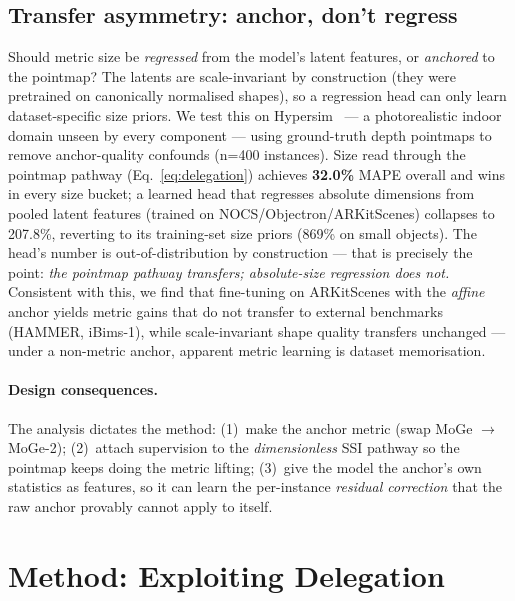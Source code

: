 \documentclass[runningheads]{llncs}
\begin{document}
\subsection{Transfer asymmetry: anchor, don't regress}
\label{sec:transfer}

Should metric size be \emph{regressed} from the model's latent features, or \emph{anchored}
to the pointmap? The latents are scale-invariant by construction (they were pretrained on
canonically normalised shapes), so a regression head can only learn dataset-specific size
priors. We test this on Hypersim~\cite{hypersim} --- a photorealistic indoor domain unseen
by every component --- using ground-truth depth pointmaps to remove anchor-quality confounds
(n=400 instances). Size read through the pointmap pathway (Eq.~\ref{eq:delegation}) achieves
\textbf{32.0\%} MAPE overall and wins in every size bucket; a learned head that regresses
absolute dimensions from pooled latent features (trained on NOCS/Objectron/ARKitScenes)
collapses to 207.8\%, reverting to its training-set size priors (869\% on small objects).
The head's number is out-of-distribution by construction --- that is precisely the point:
\emph{the pointmap pathway transfers; absolute-size regression does not.} Consistent with
this, we find that fine-tuning on ARKitScenes with the \emph{affine} anchor yields metric
gains that do not transfer to external benchmarks (HAMMER, iBims-1), while scale-invariant
shape quality transfers unchanged --- under a non-metric anchor, apparent metric learning is
dataset memorisation.

\paragraph{Design consequences.}
The analysis dictates the method: (1)~make the anchor metric (swap MoGe $\to$ MoGe-2);
(2)~attach supervision to the \emph{dimensionless} SSI pathway so the pointmap keeps doing
the metric lifting; (3)~give the model the anchor's own statistics as features, so it can
learn the per-instance \emph{residual correction} that the raw anchor provably cannot apply
to itself.

\section{Method: Exploiting Delegation}
\label{sec:method}
\end{document}
